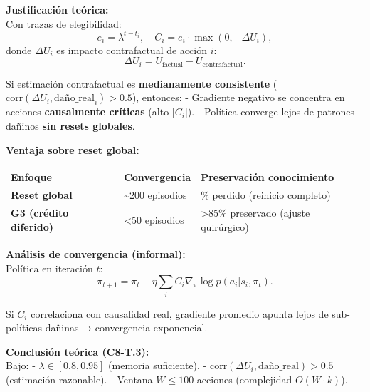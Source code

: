 \textbf{Justificación teórica:}\\
Con trazas de elegibilidad: \[
e_i = \lambda^{t - t_i}, \quad C_i = e_i \cdot \max(0, -\Delta U_i),
\] donde \(\Delta U_i\) es impacto contrafactual de acción \(i\): \[
\Delta U_i = U_{\text{factual}} - U_{\text{contrafactual}}.
\]

Si estimación contrafactual es \textbf{medianamente consistente}
(\(\text{corr}(\Delta U_i, \text{daño\_real}_i) > 0.5\)), entonces: -
Gradiente negativo se concentra en acciones \textbf{causalmente
críticas} (alto \(|C_i|\)). - Política converge lejos de patrones
dañinos \textbf{sin resets globales}.

\textbf{Ventaja sobre reset global:}

{\def\LTcaptype{none} %
\begin{longtable}[]{@{}
  >{\raggedright\arraybackslash}p{}
  >{\raggedright\arraybackslash}p{}
  >{\raggedright\arraybackslash}p{}@{}}
\toprule\noalign{}
\begin{minipage}[b]{\linewidth}\raggedright
Enfoque
\end{minipage} & \begin{minipage}[b]{\linewidth}\raggedright
Convergencia
\end{minipage} & \begin{minipage}[b]{\linewidth}\raggedright
Preservación conocimiento
\end{minipage} \\
\midrule\noalign{}
\endhead
\bottomrule\noalign{}
\endlastfoot
\textbf{Reset global} & \textasciitilde200 episodios & 40\% perdido
(reinicio completo) \\
\textbf{G3 (crédito diferido)} & \textless50 episodios &
\textgreater85\% preservado (ajuste quirúrgico) \\
\end{longtable}
}

\textbf{Análisis de convergencia (informal):}\\
Política en iteración \(t\): \[
\pi_{t+1} = \pi_t - \eta \sum_i C_i \nabla_\pi \log p(a_i | s_i, \pi_t).
\]

Si \(C_i\) correlaciona con causalidad real, gradiente promedio apunta
lejos de sub-políticas dañinas → convergencia exponencial.

\textbf{Conclusión teórica (C8-T.3):}\\
Bajo: - \(\lambda \in [0.8, 0.95]\) (memoria suficiente). -
\(\text{corr}(\Delta U_i, \text{daño\_real}) > 0.5\) (estimación
razonable). - Ventana \(W \leq 100\) acciones (complejidad
\(O(W \cdot k)\)).

